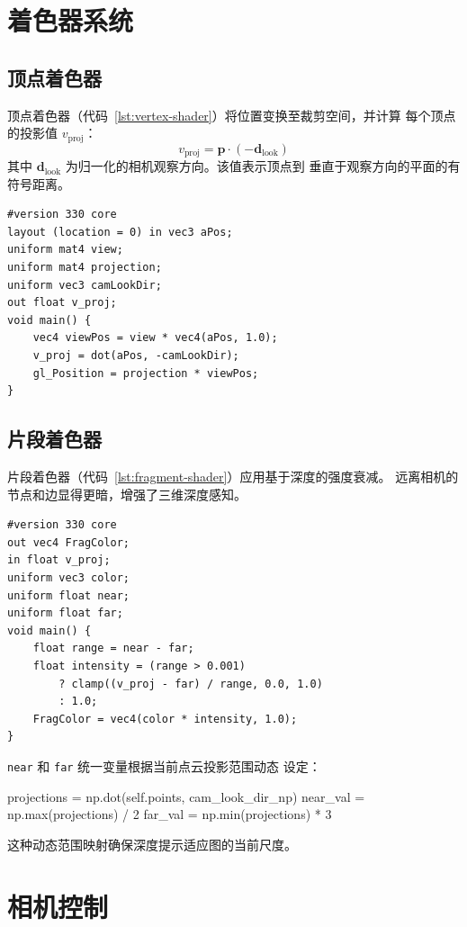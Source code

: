 \documentclass[11pt,a4paper]{report}
\begin{document}
\section{着色器系统}
\label{sec:shaders}
\subsection{顶点着色器}
\label{sec:vertex-shader}
顶点着色器（代码~\ref{lst:vertex-shader}）将位置变换至裁剪空间，并计算
每个顶点的投影值 $v_{\text{proj}}$：
\begin{equation}
    v_{\text{proj}} = \mathbf{p} \cdot (-\mathbf{d}_{\text{look}})
\end{equation}
其中 $\mathbf{d}_{\text{look}}$ 为归一化的相机观察方向。该值表示顶点到
垂直于观察方向的平面的有符号距离。
\begin{lstlisting}[style=pythonstyle,
                   caption=GLSL 顶点着色器,
                   label=lst:vertex-shader]
#version 330 core
layout (location = 0) in vec3 aPos;
uniform mat4 view;
uniform mat4 projection;
uniform vec3 camLookDir;
out float v_proj;
void main() {
    vec4 viewPos = view * vec4(aPos, 1.0);
    v_proj = dot(aPos, -camLookDir);
    gl_Position = projection * viewPos;
}
\end{lstlisting}
\subsection{片段着色器}
\label{sec:fragment-shader}
片段着色器（代码~\ref{lst:fragment-shader}）应用基于深度的强度衰减。
远离相机的节点和边显得更暗，增强了三维深度感知。
\begin{lstlisting}[style=pythonstyle,
                   caption=带深度衰减的 GLSL 片段着色器,
                   label=lst:fragment-shader]
#version 330 core
out vec4 FragColor;
in float v_proj;
uniform vec3 color;
uniform float near;
uniform float far;
void main() {
    float range = near - far;
    float intensity = (range > 0.001)
        ? clamp((v_proj - far) / range, 0.0, 1.0)
        : 1.0;
    FragColor = vec4(color * intensity, 1.0);
}
\end{lstlisting}
\lstinline{near} 和 \lstinline{far} 统一变量根据当前点云投影范围动态
设定：
\begin{pythoncode}
projections = np.dot(self.points, cam_look_dir_np)
near_val = np.max(projections) / 2
far_val  = np.min(projections) * 3
\end{pythoncode}
这种动态范围映射确保深度提示适应图的当前尺度。
\section{相机控制}
\label{sec:camera}
\end{document}
